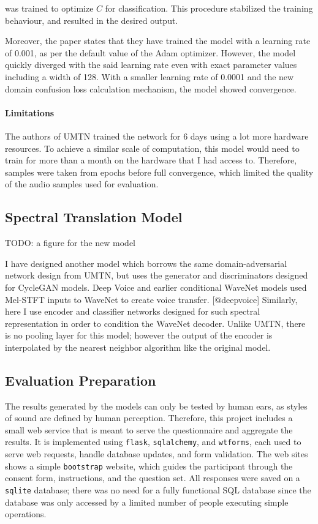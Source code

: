 \documentclass[12pt,a4paper,]{report}
\begin{document}
was trained to optimize \(C\) for classification. This procedure
stabilized the training behaviour, and resulted in the desired output.

Moreover, the paper states that they have trained the model with a
learning rate of 0.001, as per the default value of the Adam optimizer.
However, the model quickly diverged with the said learning rate even
with exact parameter values including a width of 128. With a smaller
learning rate of 0.0001 and the new domain confusion loss calculation
mechanism, the model showed convergence.

\paragraph{Limitations \label{limitations}}

The authors of UMTN trained the network for 6 days using a lot more
hardware resources. To achieve a similar scale of computation, this
model would need to train for more than a month on the hardware that I
had access to. Therefore, samples were taken from epochs before full
convergence, which limited the quality of the audio samples used for
evaluation.

\hypertarget{spectral-translation-model}{%
\subsection{Spectral Translation
Model}\label{spectral-translation-model}}

TODO: a figure for the new model

I have designed another model which borrows the same domain-adversarial
network design from UMTN, but uses the generator and discriminators
designed for CycleGAN models. Deep Voice and earlier conditional WaveNet
models used Mel-STFT inputs to WaveNet to create voice transfer.
{[}@deepvoice{]} Similarly, here I use encoder and classifier networks
designed for such spectral representation in order to condition the
WaveNet decoder. Unlike UMTN, there is no pooling layer for this model;
however the output of the encoder is interpolated by the nearest
neighbor algorithm like the original model.

\hypertarget{evaluation-preparation}{%
\subsection{Evaluation Preparation}\label{evaluation-preparation}}

The results generated by the models can only be tested by human ears, as
styles of sound are defined by human perception. Therefore, this project
includes a small web service that is meant to serve the questionnaire
and aggregate the results. It is implemented using \texttt{flask},
\texttt{sqlalchemy}, and \texttt{wtforms}, each used to serve web
requests, handle database updates, and form validation. The web sites
shows a simple \texttt{bootstrap} website, which guides the participant
through the consent form, instructions, and the question set. All
responses were saved on a \texttt{sqlite} database; there was no need
for a fully functional SQL database since the database was only accessed
by a limited number of people executing simple operations.
\end{document}
